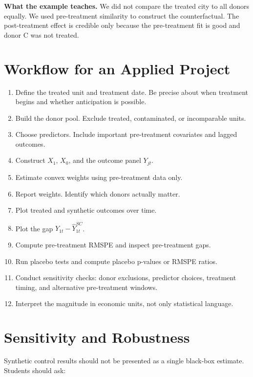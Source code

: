 \begin{boxF}
\textbf{What the example teaches.} We did not compare the treated city to all donors equally. We used pre-treatment similarity to construct the counterfactual. The post-treatment effect is credible only because the pre-treatment fit is good and donor C was not treated.
\end{boxF}

\section{Workflow for an Applied Project}

\begin{enumerate}
\item Define the treated unit and treatment date. Be precise about when treatment begins and whether anticipation is possible.
\item Build the donor pool. Exclude treated, contaminated, or incomparable units.
\item Choose predictors. Include important pre-treatment covariates and lagged outcomes.
\item Construct \(X_1\), \(X_0\), and the outcome panel \(Y_{jt}\).
\item Estimate convex weights using pre-treatment data only.
\item Report weights. Identify which donors actually matter.
\item Plot treated and synthetic outcomes over time.
\item Plot the gap \(Y_{1t}-\widehat{Y}^{SC}_{1t}\).
\item Compute pre-treatment RMSPE and inspect pre-treatment gaps.
\item Run placebo tests and compute placebo p-values or RMSPE ratios.
\item Conduct sensitivity checks: donor exclusions, predictor choices, treatment timing, and alternative pre-treatment windows.
\item Interpret the magnitude in economic units, not only statistical language.
\end{enumerate}

\section{Sensitivity and Robustness}

Synthetic control results should not be presented as a single black-box estimate. Students should ask:


